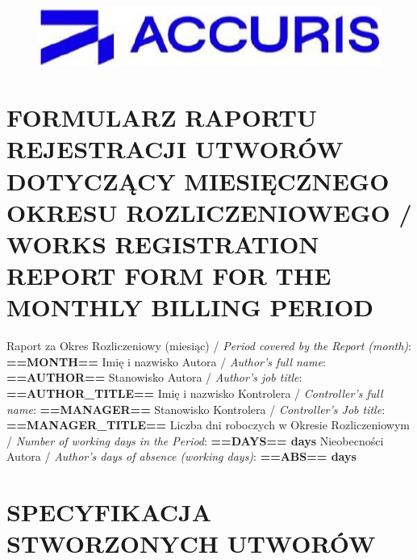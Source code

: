 \documentclass[10pt]{report}
\begin{document}
	\begin{figure}
		\includegraphics[width=0.35\linewidth]{accuris-logo.png}
	\end{figure}

	{\color{blue} \section*{FORMULARZ RAPORTU REJESTRACJI UTWORÓW DOTYCZĄCY MIESIĘCZNEGO OKRESU ROZLICZENIOWEGO / WORKS REGISTRATION REPORT FORM FOR THE MONTHLY BILLING PERIOD}}

	{\small Raport za Okres Rozliczeniowy (miesiąc) / \textit{Period covered by the Report (month)}: \textbf{==MONTH==}}\newline
	{\small Imię i nazwisko Autora / \textit{Author's full name}: \textbf{==AUTHOR==}}\newline
	{\small Stanowisko Autora / \textit{Author's job title}: \textbf{==AUTHOR_TITLE==}}\newline
	{\small Imię i nazwisko Kontrolera / \textit{Controller's full name}: \textbf{==MANAGER==}}\newline
	{\small Stanowisko Kontrolera / \textit{Controller's Job title}: \textbf{==MANAGER_TITLE==}}\newline
	{\small Liczba dni roboczych w Okresie Rozliczeniowym / \textit{Number of working days in the Period}: \textbf{==DAYS== days}}\newline
	{\small Nieobecności Autora / \textit{Author's days of absence (working days)}: \textbf{==ABS== days}}\newline
	
	\section*{SPECYFIKACJA STWORZONYCH UTWORÓW}
		
\end{document}
